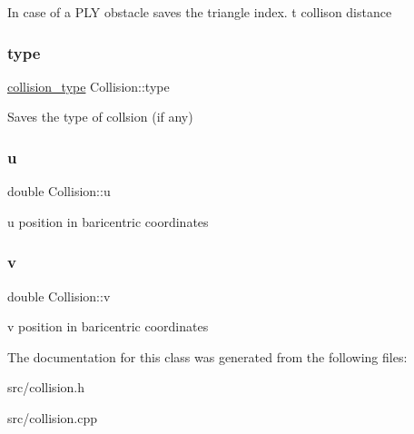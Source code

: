 In case of a P\+LY obstacle saves the triangle index. t collison distance \mbox{\label{class_collision_a384809577e353e0905047beac856015b}} 
\subsubsection{\texorpdfstring{type}{type}}
{\footnotesize\ttfamily \hyperlink{class_collision_aa7f309840b693689b164c7e4b4d643e5}{collision\+\_\+type} Collision\+::type}

Saves the type of collsion (if any) \mbox{\label{class_collision_a6d79ffbca0e7f67fdc9af809f13f7f8a}} 
\subsubsection{\texorpdfstring{u}{u}}
{\footnotesize\ttfamily double Collision\+::u}

u position in baricentric coordinates \mbox{\label{class_collision_ade5759fea1e6b41812d2499f1dc06c02}} 
\subsubsection{\texorpdfstring{v}{v}}
{\footnotesize\ttfamily double Collision\+::v}

v position in baricentric coordinates 

The documentation for this class was generated from the following files\+:\begin{DoxyCompactItemize}
\item 
src/collision.\+h\item 
src/collision.\+cpp\end{DoxyCompactItemize}
